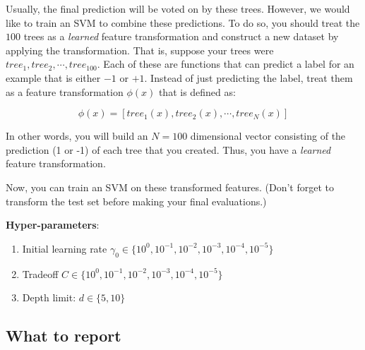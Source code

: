 \begin{enumerate}
  Usually, the final prediction will be voted on by these trees. However, we
  would like to train an SVM to combine these predictions. To do so, you should
  treat the $100$ trees as a \emph{learned} feature transformation and construct
  a new dataset by applying the transformation. That is, suppose your trees were
  $tree_1, tree_2, \cdots, tree_{100}$. Each of these are functions that can
  predict a label for an example that is either $-1$ or $+1$. Instead of just
  predicting the label, treat them as a feature transformation $\phi(x)$ that is
  defined as:

  
  $$\phi(x) = [tree_1(x), tree_2(x), \cdots, tree_{N} (x)]$$  

  In other words, you will build an $N=100$ dimensional vector consisting of the
  prediction (1 or -1) of each tree that you created. Thus, you have a {\em
    learned} feature transformation.

  Now, you can train an SVM on these transformed features.  (Don't forget to
  transform the test set before making your final evaluations.)

  \textbf{Hyper-parameters}:
  \begin{enumerate}
  \item Initial learning rate $\gamma_0 \in\{10^0, 10^{-1}, 10^{-2}, 10^{-3}, 10^{-4}, 10^{-5}\}$
  \item Tradeoff $C \in \{10^0, 10^{-1}, 10^{-2}, 10^{-3}, 10^{-4}, 10^{-5}\}$
  \item Depth limit: $d \in \{5, 10\}$
  \end{enumerate}


\end{enumerate}


\subsection{What to report}

